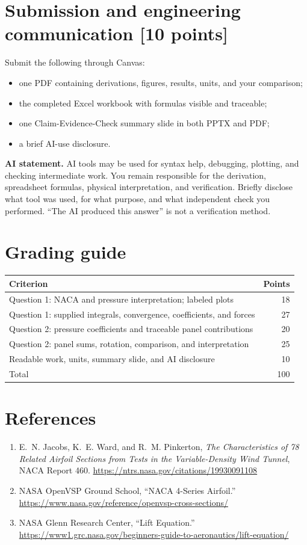\documentclass[11pt]{article}
\begin{document}
\section*{Submission and engineering communication \hfill [10 points]}
Submit the following through Canvas:
\begin{itemize}
  \item one PDF containing derivations, figures, results, units, and your comparison;
  \item the completed Excel workbook with formulas visible and traceable;
  \item one Claim-Evidence-Check summary slide in both PPTX and PDF;
  \item a brief AI-use disclosure.
\end{itemize}

\textbf{AI statement.} AI tools may be used for syntax help, debugging, plotting, and checking intermediate work. You remain responsible for the derivation, spreadsheet formulas, physical interpretation, and verification. Briefly disclose what tool was used, for what purpose, and what independent check you performed. ``The AI produced this answer'' is not a verification method.

\section*{Grading guide}
\begin{center}
\begin{tabularx}{\textwidth}{X r}
\toprule
Criterion & Points\\
\midrule
Question 1: NACA and pressure interpretation; labeled plots & 18\\
Question 1: supplied integrals, convergence, coefficients, and forces & 27\\
Question 2: pressure coefficients and traceable panel contributions & 20\\
Question 2: panel sums, rotation, comparison, and interpretation & 25\\
Readable work, units, summary slide, and AI disclosure & 10\\
\midrule
Total & 100\\
\bottomrule
\end{tabularx}
\end{center}

\section*{References}
\begin{enumerate}
  \item E.~N. Jacobs, K.~E. Ward, and R.~M. Pinkerton, \emph{The Characteristics of 78 Related Airfoil Sections from Tests in the Variable-Density Wind Tunnel}, NACA Report 460. \url{https://ntrs.nasa.gov/citations/19930091108}
  \item NASA OpenVSP Ground School, ``NACA 4-Series Airfoil.'' \url{https://www.nasa.gov/reference/openvsp-cross-sections/}
  \item NASA Glenn Research Center, ``Lift Equation.'' \url{https://www1.grc.nasa.gov/beginners-guide-to-aeronautics/lift-equation/}
\end{enumerate}
\end{document}
